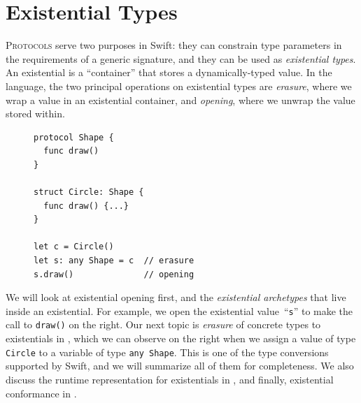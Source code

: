 \documentclass[../generics]{subfiles}
\begin{document}
\chapter{Existential Types}\label{chap:existential types}

\lettrine{P}{rotocols} serve two purposes in Swift: they can constrain type parameters in the requirements of a generic signature, and they can be used as \emph{existential types}. An existential is a ``container'' that stores a dynamically-typed value. In the language, the two principal operations on existential types are \emph{erasure}, where we wrap a value in an existential container, and \emph{opening}, where we unwrap the value stored within.

\begin{figure}
\begin{minipage}{17.5em}
\begin{Verbatim}
protocol Shape {
  func draw()
}

struct Circle: Shape {
  func draw() {...}
}

let c = Circle()
let s: any Shape = c  // erasure
s.draw()              // opening
\end{Verbatim}
\end{minipage}
\end{figure}

We will look at existential opening first, and the \emph{existential archetypes} that live inside an existential. For example, we open the existential value~``\texttt{s}'' to make the call to \texttt{draw()} on the right.
%
Our next topic is \emph{erasure} of concrete types to existentials in , which we can observe on the right when we assign a value of type \texttt{Circle} to a variable of type \texttt{any~Shape}. This is one of the type conversions supported by Swift, and we will summarize all of them for completeness. We also discuss the runtime representation for existentials in , and finally, existential conformance in .
\end{document}
